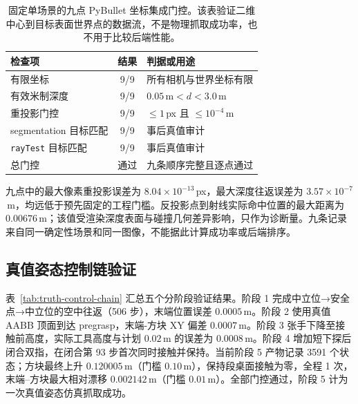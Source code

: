 \documentclass{l4proj}
\begin{document}
\begin{table}[htbp]
  \centering
  \caption{固定单场景的九点 PyBullet 坐标集成门控。该表验证二维中心到目标表面世界点的数据流，不是物理抓取成功率，也不用于比较后端性能。}
  \label{tab:pybullet-backprojection}
  \begin{tabular}{lcl}
    \toprule
    检查项 & 结果 & 判据或用途 \\
    \midrule
    有限坐标 & 9/9 & 所有相机与世界坐标有限 \\
    有效米制深度 & 9/9 & $0.05\,\mathrm{m}<d<3.0\,\mathrm{m}$ \\
    重投影门控 & 9/9 & $\leq1$\,px 且 $\leq10^{-4}$\,m \\
    segmentation 目标匹配 & 9/9 & 事后真值审计 \\
    \texttt{rayTest} 目标匹配 & 9/9 & 事后真值审计 \\
    总门控 & 通过 & 九条顺序完整且逐点通过 \\
    \bottomrule
  \end{tabular}
\end{table}

九点中的最大像素重投影误差为 $8.04\times10^{-13}$\,px，最大深度往返误差为 $3.57\times10^{-7}$\,m，均远低于预先固定的工程门槛。反投影点到射线实际命中位置的最大距离为 $0.00676$\,m；该值受渲染深度表面与碰撞几何差异影响，只作为诊断量。九条记录来自同一确定性场景和同一图像，不能据此计算成功率或后端排序。

\subsection{真值姿态控制链验证}
表~\ref{tab:truth-control-chain} 汇总五个分阶段验证结果。阶段 1 完成中立位→安全点→中立位的空中往返（506 步），末端位置误差 $0.0005$\,m。阶段 2 使用真值 AABB 顶面到达 pregrasp，末端-方块 XY 偏差 $0.0007$\,m。阶段 3 张手下降至接触前高度，实际工具高度与计划 $0.02$\,m 的误差为 $0.0008$\,m。阶段 4 增加短下探后闭合双指，在闭合第 93 步首次同时接触并保持。当前阶段 5 产物记录 3591 个状态；方块最终上升 $0.120005$\,m（门槛 $0.10$\,m），保持段桌面接触为零，全程 1 次，末端--方块最大相对漂移 $0.002142$\,m（门槛 $0.01$\,m）。全部门控通过，阶段 5 计为一次真值姿态仿真抓取成功。
\end{document}
